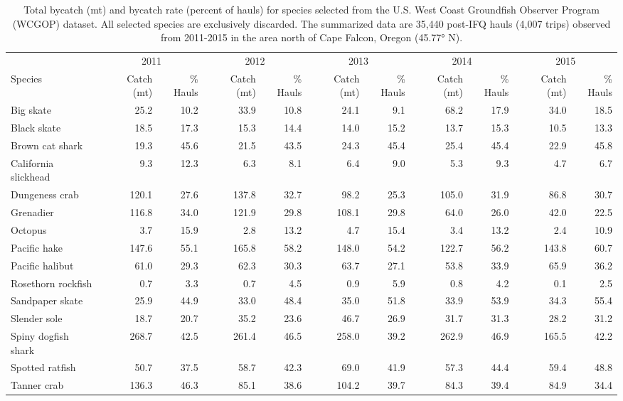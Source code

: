 \documentclass[]{article}
\begin{document}
\begin{landscape}\begin{table}

\caption{\label{tab:species-list-byyear}\label{tab:species-list-byyear}Total bycatch (mt) and bycatch rate (percent of hauls) for species selected from the U.S. West Coast Groundfish Observer Program (WCGOP) dataset. All selected species are exclusively discarded. The summarized data are 35,440 post-IFQ hauls (4,007 trips) observed from 2011-2015 in the area north of Cape Falcon, Oregon (45.77° N).}
\centering
\begin{tabular}[t]{lrrrrrrrrrr}
\toprule
\multicolumn{1}{c}{ } & \multicolumn{2}{c}{2011} & \multicolumn{2}{c}{2012} & \multicolumn{2}{c}{2013} & \multicolumn{2}{c}{2014} & \multicolumn{2}{c}{2015} \\
\cmidrule(l{2pt}r{2pt}){2-3} \cmidrule(l{2pt}r{2pt}){4-5} \cmidrule(l{2pt}r{2pt}){6-7} \cmidrule(l{2pt}r{2pt}){8-9} \cmidrule(l{2pt}r{2pt}){10-11}
Species & Catch (mt) & \% Hauls & Catch (mt) & \% Hauls & Catch (mt) & \% Hauls & Catch (mt) & \% Hauls & Catch (mt) & \% Hauls\\
\midrule
Big skate & 25.2 & 10.2 & 33.9 & 10.8 & 24.1 & 9.1 & 68.2 & 17.9 & 34.0 & 18.5\\
Black skate & 18.5 & 17.3 & 15.3 & 14.4 & 14.0 & 15.2 & 13.7 & 15.3 & 10.5 & 13.3\\
Brown cat shark & 19.3 & 45.6 & 21.5 & 43.5 & 24.3 & 45.4 & 25.4 & 45.4 & 22.9 & 45.8\\
California slickhead & 9.3 & 12.3 & 6.3 & 8.1 & 6.4 & 9.0 & 5.3 & 9.3 & 4.7 & 6.7\\
Dungeness crab & 120.1 & 27.6 & 137.8 & 32.7 & 98.2 & 25.3 & 105.0 & 31.9 & 86.8 & 30.7\\
\addlinespace
Grenadier & 116.8 & 34.0 & 121.9 & 29.8 & 108.1 & 29.8 & 64.0 & 26.0 & 42.0 & 22.5\\
Octopus & 3.7 & 15.9 & 2.8 & 13.2 & 4.7 & 15.4 & 3.4 & 13.2 & 2.4 & 10.9\\
Pacific hake & 147.6 & 55.1 & 165.8 & 58.2 & 148.0 & 54.2 & 122.7 & 56.2 & 143.8 & 60.7\\
Pacific halibut & 61.0 & 29.3 & 62.3 & 30.3 & 63.7 & 27.1 & 53.8 & 33.9 & 65.9 & 36.2\\
Rosethorn rockfish & 0.7 & 3.3 & 0.7 & 4.5 & 0.9 & 5.9 & 0.8 & 4.2 & 0.1 & 2.5\\
\addlinespace
Sandpaper skate & 25.9 & 44.9 & 33.0 & 48.4 & 35.0 & 51.8 & 33.9 & 53.9 & 34.3 & 55.4\\
Slender sole & 18.7 & 20.7 & 35.2 & 23.6 & 46.7 & 26.9 & 31.7 & 31.3 & 28.2 & 31.2\\
Spiny dogfish shark & 268.7 & 42.5 & 261.4 & 46.5 & 258.0 & 39.2 & 262.9 & 46.9 & 165.5 & 42.2\\
Spotted ratfish & 50.7 & 37.5 & 58.7 & 42.3 & 69.0 & 41.9 & 57.3 & 44.4 & 59.4 & 48.8\\
Tanner crab & 136.3 & 46.3 & 85.1 & 38.6 & 104.2 & 39.7 & 84.3 & 39.4 & 84.9 & 34.4\\
\bottomrule
\end{tabular}
\end{table}
\end{landscape}
\end{document}
